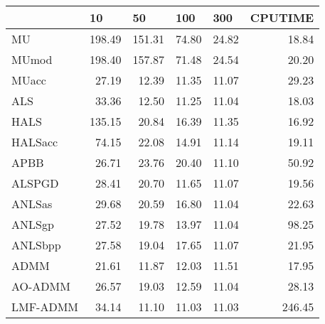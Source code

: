 \documentclass{article}
\begin{document}
\begin{table}[H]
	\centering
	\begin{tabular}{|l|r|r|r|r|r|}
		\hline
		& \multicolumn{1}{l|}{10} & \multicolumn{1}{l|}{50} & \multicolumn{1}{l|}{100} & \multicolumn{1}{l|}{300} & \multicolumn{1}{l|}{CPUTIME} \\ \hline
		MU       & 198.49                  & 151.31                  & 74.80                    & 24.82                    & 18.84                        \\ \hline
		MUmod    & 198.40                  & 157.87                  & 71.48                    & 24.54                    & 20.20                        \\ \hline
		MUacc    & 27.19                   & 12.39                   & 11.35                    & 11.07                    & 29.23                        \\ \hline
		ALS      & 33.36                   & 12.50                   & 11.25                    & 11.04                    & 18.03                        \\ \hline
		HALS     & 135.15                  & 20.84                   & 16.39                    & 11.35                    & 16.92                        \\ \hline
		HALSacc  & 74.15                   & 22.08                   & 14.91                    & 11.14                    & 19.11                        \\ \hline
		APBB     & 26.71                   & 23.76                   & 20.40                    & 11.10                    & 50.92                        \\ \hline
		ALSPGD   & 28.41                   & 20.70                   & 11.65                    & 11.07                    & 19.56                        \\ \hline
		ANLSas   & 29.68                   & 20.59                   & 16.80                    & 11.04                    & 22.63                        \\ \hline
		ANLSgp   & 27.52                   & 19.78                   & 13.97                    & 11.04                    & 98.25                        \\ \hline
		ANLSbpp  & 27.58                   & 19.04                   & 17.65                    & 11.07                    & 21.95                        \\ \hline
		ADMM     & 21.61                   & 11.87                   & 12.03                    & 11.51                    & 17.95                        \\ \hline
		AO-ADMM  & 26.57                   & 19.03                   & 12.59                    & 11.04                    & 28.13                        \\ \hline
		LMF-ADMM & 34.14                   & 11.10                   & 11.03                    & 11.03                    & 246.45                       \\ \hline
	\end{tabular}
\end{table}
\end{document}

